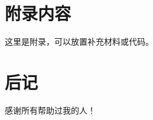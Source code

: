 \documentclass[12pt, a4paper, openany]{ctexbook} %
\begin{document}
\appendix
\chapter{附录内容}
这里是附录，可以放置补充材料或代码。

\printbibliography[title=参考文献]

\backmatter
\chapter{后记}
感谢所有帮助过我的人！
\end{document}
